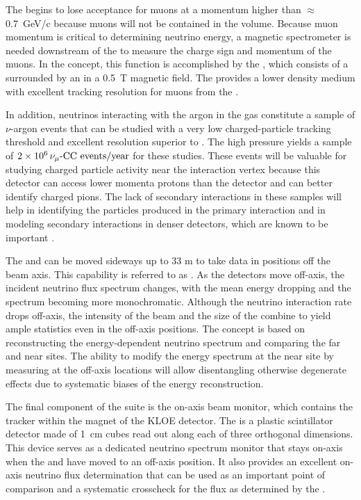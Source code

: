 The  begins to lose acceptance for muons at a momentum higher than 
$\approx$0.7~GeV/c because muons will not be contained in the  volume.  Because muon momentum is critical to determining neutrino energy, a magnetic spectrometer is needed downstream of the  to measure the charge sign and momentum of the muons.  In the   concept, this function is accomplished by the , which consists of a  surrounded by an  in a \SI{0.5}{T} magnetic field. The  provides a lower density medium with excellent tracking resolution for muons from the .  

In addition, neutrinos interacting with the argon in the gas  constitute a sample of $\nu$-argon events that can be studied with a very low charged-particle tracking threshold and excellent resolution superior to . The high pressure yields a sample of 
$\num{2e6}\,{\nu_\mu \text{-CC events/year}}$ for these studies. These events will be valuable for studying charged particle activity near the interaction vertex because this detector can access lower momenta protons than the  detector and can better identify charged pions.  The lack of secondary interactions in these samples will help in identifying the particles produced in the primary interaction and in modeling secondary interactions in denser detectors, which are known to be important \cite{Friedland:2018vry}.

The  and  can be moved sideways up to 33 m to take data in positions off the beam axis.  This capability is referred to as . As the detectors move off-axis, the incident neutrino flux spectrum changes, with the mean energy dropping and the spectrum becoming more monochromatic.  Although the neutrino interaction rate drops off-axis, the intensity of the beam and the size of the   combine to yield ample statistics even in the off-axis positions.
The  concept is based on reconstructing the energy-dependent neutrino spectrum and
comparing the far and near sites. The ability to modify the energy spectrum at the near site by measuring at the off-axis locations will allow disentangling otherwise degenerate effects due to systematic biases of the energy reconstruction.

The final component of the   suite is the on-axis beam monitor, which contains the
 tracker within the magnet of the KLOE detector.  The  is a plastic scintillator detector made of \SI{1}{cm} cubes read out along each of three orthogonal dimensions.  
This device serves as a dedicated  neutrino spectrum monitor that stays on-axis  when the  and  have moved to an off-axis position. 
It also provides an excellent on-axis neutrino flux determination that can be used as an important point of comparison and a systematic crosscheck for the flux as determined by the .

